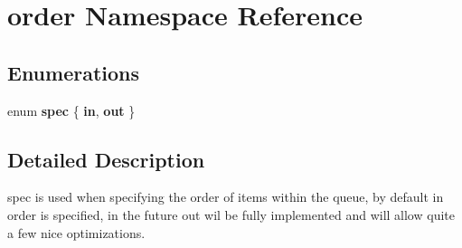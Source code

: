 \hypertarget{namespaceorder}{}\section{order Namespace Reference}
\label{namespaceorder}
\subsection*{Enumerations}
\begin{DoxyCompactItemize}
\item 
\hypertarget{namespaceorder_af96f1ea4750f0b4d403fff77457cc11e}{}enum {\bfseries spec} \{ {\bfseries in}, 
{\bfseries out}
 \}\label{namespaceorder_af96f1ea4750f0b4d403fff77457cc11e}

\end{DoxyCompactItemize}


\subsection{Detailed Description}
spec is used when specifying the order of items within the queue, by default in order is specified, in the future out wil be fully implemented and will allow quite a few nice optimizations. 